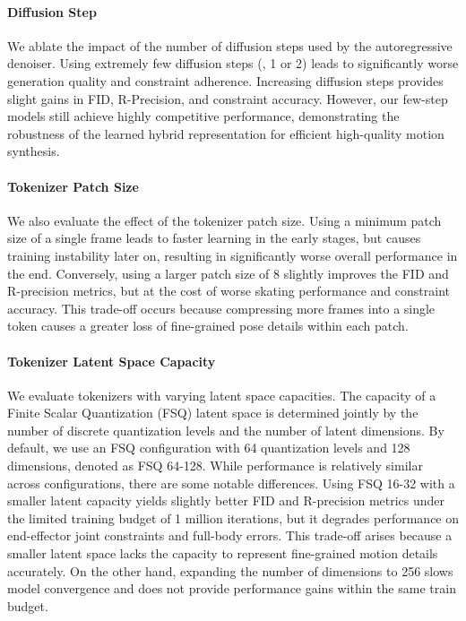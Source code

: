 \paragraph{Diffusion Step}
We ablate the impact of the number of diffusion steps used by the autoregressive denoiser.
Using extremely few diffusion steps (\eg, 1 or 2) leads to significantly worse generation quality and constraint adherence.
Increasing diffusion steps provides slight gains in FID, R-Precision, and constraint accuracy. However, our few-step models still achieve highly competitive performance, demonstrating the robustness of the learned hybrid representation for efficient high-quality motion synthesis.

\paragraph{Tokenizer Patch Size}
We also evaluate the effect of the tokenizer patch size. Using a minimum patch size of a single frame leads to faster learning in the early stages, but causes training instability later on, resulting in significantly worse overall performance in the end. Conversely, using a larger patch size of 8 slightly improves the FID and R-precision metrics, but at the cost of worse skating performance and constraint accuracy. This trade-off occurs because compressing more frames into a single token causes a greater loss of fine-grained pose details within each patch.
\paragraph{Tokenizer Latent Space Capacity}
We evaluate tokenizers with varying latent space capacities. The capacity of a Finite Scalar Quantization (FSQ) latent space is determined jointly by the number of discrete quantization levels and the number of latent dimensions. By default, we use an FSQ configuration with 64 quantization levels and 128 dimensions, denoted as FSQ 64-128. While performance is relatively similar across configurations, there are some notable differences. Using FSQ 16-32 with a smaller latent capacity yields slightly better FID and R-precision metrics under the limited training budget of 1 million iterations, but it degrades performance on end-effector joint constraints and full-body errors. This trade-off arises because a smaller latent space lacks the capacity to represent fine-grained motion details accurately. On the other hand, expanding the number of dimensions to 256 slows model convergence and does not provide performance gains within the same train budget.


